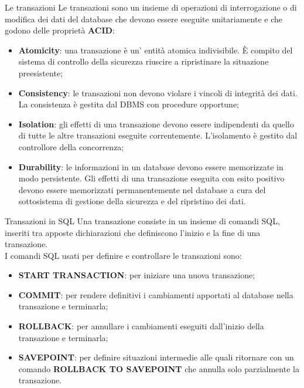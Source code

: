 \begin{frame}[fragile]{Le transazioni}
Le transazioni sono un insieme di operazioni di interrogazione o di modifica dei dati del database che devono essere eseguite unitariamente e che godono delle propriet\`a \textbf{ACID}:
\begin{itemize}[<+->]
    \item \textbf{Atomicity}: una transazione \`e un' entit\`a atomica indivisibile. \`E compito del sistema di controllo della sicurezza riuscire a ripristinare la situazione preesistente;
    \item \textbf{Consistency}: le transazioni non devono violare i vincoli di integrit\`a dei dati. La consistenza \`e gestita dal DBMS con procedure opportune;
    \item \textbf{Isolation}: gli effetti di una transazione devono essere indipendenti da quello di tutte le altre transazioni eseguite correntemente. L'isolamento \`e gestito dal controllore della concorrenza;
    \item \textbf{Durability}: le informazioni in un database devono essere memorizzate in modo persistente. Gli effetti di una transazione eseguita con esito positivo devono essere memorizzati permanentemente nel database a cura del sottosistema di gestione della sicurezza e del ripristino dei dati.
\end{itemize}
\end{frame}
%
\begin{frame}{Transazioni in SQL}
Una transazione consiste in un insieme di comandi SQL, inseriti tra apposte dichiarazioni che definiscono l'inizio e la fine di una transazione.
\newline
\\I comandi SQL usati per definire e controllare le transazioni sono:
\begin{itemize}[<+->]
    \item \textbf{START TRANSACTION}: per iniziare una nuova transazione;
    \item \textbf{COMMIT}: per rendere definitivi i cambiamenti apportati al database nella transazione e terminarla;
    \item \textbf{ROLLBACK}: per annullare i cambiamenti eseguiti dall'inizio della transazione e terminarla;
    \item \textbf{SAVEPOINT}: per definire situazioni intermedie alle quali ritornare con un comando \textbf{ROLLBACK TO SAVEPOINT} che annulla solo parzialmente la transazione.
\end{itemize}
\end{frame}
